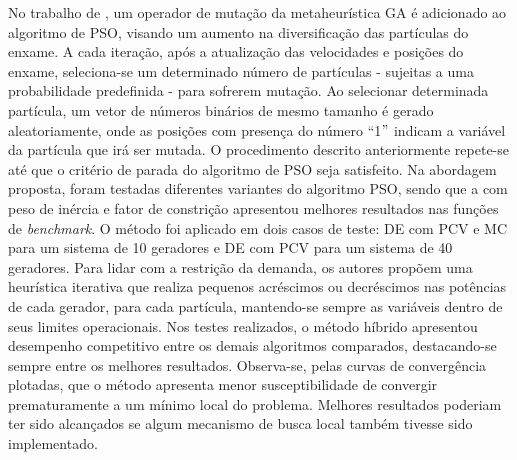 \documentclass[
	12pt,				%
	openany,			%
	twoside,			%
	a4paper,			%
	chapter=TITLE,		%
	section=Title,		%
	subsection=Title,	%
	subsubsection=Title,%
	english,			%
	french,				%
	spanish,			%
	brazil			%
	]{abntex2}
\begin{document}
\begin{ERRATA}
No trabalho de , um operador de mutação da metaheurística GA é adicionado ao algoritmo de PSO, visando um aumento na diversificação das partículas do enxame. A cada iteração, após a atualização das velocidades e posições do enxame, seleciona-se um determinado número de partículas - sujeitas a uma probabilidade predefinida - para sofrerem mutação. Ao selecionar determinada partícula, um vetor de números binários de mesmo tamanho é gerado aleatoriamente, onde as posições com presença do número ``1$"$ indicam a variável da partícula que irá ser mutada. O procedimento descrito anteriormente repete-se até que o critério de parada do algoritmo de PSO seja satisfeito. Na abordagem proposta, foram testadas diferentes variantes do algoritmo PSO, sendo que a com peso de inércia e fator de constrição apresentou melhores resultados nas funções de \emph{benchmark}. O método foi aplicado em dois casos de teste: DE com PCV e MC para um sistema de 10 geradores e DE com PCV para um sistema de 40 geradores. Para lidar com a restrição da demanda, os autores propõem uma heurística iterativa que realiza pequenos acréscimos ou decréscimos nas potências de cada gerador, para cada partícula, mantendo-se sempre as variáveis dentro de seus limites operacionais. Nos testes realizados, o método híbrido apresentou desempenho competitivo entre os demais algoritmos comparados, destacando-se sempre entre os melhores resultados. Observa-se, pelas curvas de convergência plotadas, que o método apresenta menor susceptibilidade de convergir prematuramente a um mínimo local do problema. Melhores resultados poderiam ter sido alcançados se algum mecanismo de busca local também tivesse sido implementado.



\end{ERRATA}
\end{document}
